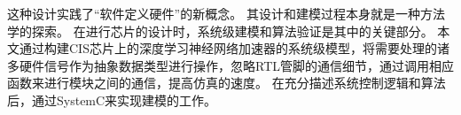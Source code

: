 这种设计实践了“软件定义硬件”的新概念。
其设计和建模过程本身就是一种方法学的探索。
在进行芯片的设计时，系统级建模和算法验证是其中的关键部分。
本文通过构建CIS芯片上的深度学习神经网络加速器的系统级模型，将需要处理的诸多硬件信号作为抽象数据类型进行操作，忽略RTL管脚的通信细节，通过调用相应函数来进行模块之间的通信，提高仿真的速度\cite{2007ESL}。
在充分描述系统控制逻辑和算法后，通过SystemC来实现建模的工作。
